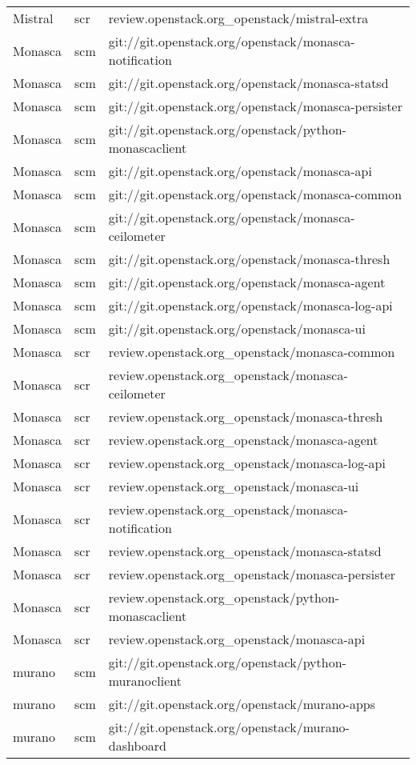 \begin{center}
\begin{longtable}{|p{4cm}|p{1cm}|p{10cm}|}
Mistral&scr&review.openstack.org\_openstack/mistral-extra\\ 
Monasca&scm&git://git.openstack.org/openstack/monasca-notification\\ 
Monasca&scm&git://git.openstack.org/openstack/monasca-statsd\\ 
Monasca&scm&git://git.openstack.org/openstack/monasca-persister\\ 
Monasca&scm&git://git.openstack.org/openstack/python-monascaclient\\ 
Monasca&scm&git://git.openstack.org/openstack/monasca-api\\ 
Monasca&scm&git://git.openstack.org/openstack/monasca-common\\ 
Monasca&scm&git://git.openstack.org/openstack/monasca-ceilometer\\ 
Monasca&scm&git://git.openstack.org/openstack/monasca-thresh\\ 
Monasca&scm&git://git.openstack.org/openstack/monasca-agent\\ 
Monasca&scm&git://git.openstack.org/openstack/monasca-log-api\\ 
Monasca&scm&git://git.openstack.org/openstack/monasca-ui\\ 
Monasca&scr&review.openstack.org\_openstack/monasca-common\\ 
Monasca&scr&review.openstack.org\_openstack/monasca-ceilometer\\ 
Monasca&scr&review.openstack.org\_openstack/monasca-thresh\\ 
Monasca&scr&review.openstack.org\_openstack/monasca-agent\\ 
Monasca&scr&review.openstack.org\_openstack/monasca-log-api\\ 
Monasca&scr&review.openstack.org\_openstack/monasca-ui\\ 
Monasca&scr&review.openstack.org\_openstack/monasca-notification\\ 
Monasca&scr&review.openstack.org\_openstack/monasca-statsd\\ 
Monasca&scr&review.openstack.org\_openstack/monasca-persister\\ 
Monasca&scr&review.openstack.org\_openstack/python-monascaclient\\ 
Monasca&scr&review.openstack.org\_openstack/monasca-api\\ 
murano&scm&git://git.openstack.org/openstack/python-muranoclient\\ 
murano&scm&git://git.openstack.org/openstack/murano-apps\\ 
murano&scm&git://git.openstack.org/openstack/murano-dashboard\\ 

\end{longtable}
\end{center}
